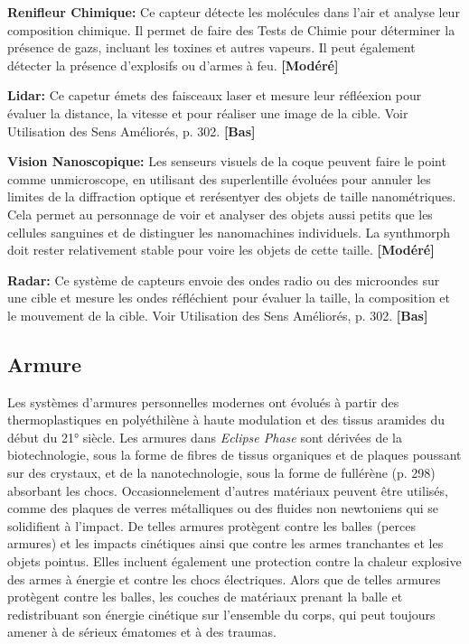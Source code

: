 \textbf{Renifleur Chimique:} Ce capteur détecte les molécules dans l'air et analyse leur composition chimique. Il permet de faire des Tests de Chimie pour déterminer la présence de gazs, incluant les toxines et autres vapeurs. Il peut également détecter la présence d'explosifs ou d'armes à feu. \textbf{[Modéré]} 

\textbf{Lidar:} Ce capetur émets des faisceaux laser et mesure leur réfléexion pour évaluer la distance, la vitesse et pour réaliser une image de la cible. Voir Utilisation des Sens Améliorés, p. 302. \textbf{[Bas]} 

\textbf{Vision Nanoscopique:} Les senseurs visuels de la coque peuvent faire le point comme unmicroscope, en utilisant des superlentille évoluées pour annuler les limites de la diffraction optique et rerésentyer des objets de taille nanométriques. Cela permet au personnage de voir et analyser des objets aussi petits que les cellules sanguines et de distinguer les nanomachines individuels. La synthmorph doit rester relativement stable pour voire les objets de cette taille. \textbf{[Modéré]} 

\textbf{Radar:} Ce système de capteurs envoie des ondes radio ou des microondes sur une cible et mesure les ondes réfléchient pour évaluer la taille, la composition et le mouvement de la cible. Voir Utilisation des Sens Améliorés, p. 302. \textbf{[Bas]} 

\subsection{Armure} \label{sec:armor} 

Les systèmes d'armures personnelles modernes ont évolués à partir des thermoplastiques en polyéthilène à haute modulation et des tissus aramides du début du 21° siècle. Les armures dans \emph{Eclipse Phase} sont dérivées de la biotechnologie, sous la forme de fibres de tissus organiques et de plaques poussant sur des crystaux, et de la nanotechnologie, sous la forme de fullérène (p. 298) absorbant les chocs. Occasionnelement d'autres matériaux peuvent être utilisés, comme des plaques de verres métalliques ou des fluides non newtoniens qui se solidifient à l'impact. De telles armures protègent contre les balles (perces armures) et les impacts cinétiques ainsi que contre les armes tranchantes et les objets pointus. Elles incluent également une protection contre la chaleur explosive des armes à énergie et contre les chocs électriques. Alors que de telles armures protègent contre les balles, les couches de matériaux prenant la balle et redistribuant son énergie cinétique sur l'ensemble du corps, qui peut toujours amener à de sérieux ématomes et à des traumas. 

